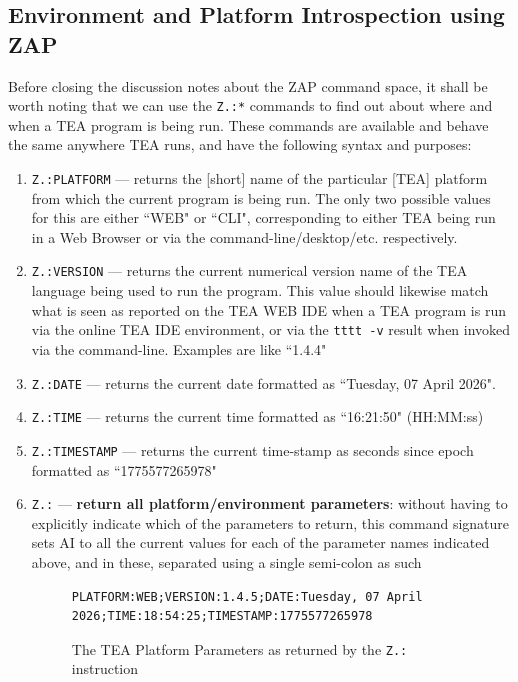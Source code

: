\documentclass[a4paper, 18pt]{book} %
\begin{document}
{{{\subsection{Environment and Platform Introspection using ZAP}

Before closing the discussion notes about the ZAP command space, it shall be worth noting that we can use the \texttt{Z.:*} commands to find out about where and when a TEA program is being run. These commands are available and behave the same anywhere TEA runs, and have the following syntax and purposes:

\vspace{2em}

\begin{enumerate}
\item \texttt{Z.:PLATFORM} --- returns the [short] name of the particular [TEA] platform from which the current program is being run. The only two possible values for this are either ``WEB" or ``CLI", corresponding to either TEA being run in a Web Browser or via the command-line/desktop/etc. respectively.
\item \texttt{Z.:VERSION} --- returns the current numerical version name of the TEA language being used to run the program. This value should likewise match what is seen as reported on the TEA WEB IDE when a TEA program is run via the online TEA IDE environment, or via the \texttt{tttt -v} result when invoked via the command-line. Examples are like ``1.4.4"
\item \texttt{Z.:DATE} --- returns the current date formatted as ``Tuesday, 07 April 2026".
\item \texttt{Z.:TIME} --- returns the current time formatted as ``16:21:50" (HH:MM:ss)
\item \texttt{Z.:TIMESTAMP} --- returns the current time-stamp as seconds since epoch formatted as ``1775577265978"
\item{ \texttt{Z.:} --- \textbf{return all platform/environment parameters}: without having to explicitly indicate which of the parameters to return, this command signature sets AI to all the current values for each of the parameter names indicated above, and in these, separated using a single semi-colon as such 

\begin{figure}[H]
  \centering
  \begin{tcolorbox}[myterminalstyle, title=TEA Environment/Platform Parameters]
  \begin{lstlisting}
PLATFORM:WEB;VERSION:1.4.5;DATE:Tuesday, 07 April 2026;TIME:18:54:25;TIMESTAMP:1775577265978
  \end{lstlisting}
  \end{tcolorbox}
  \caption{The TEA Platform Parameters as returned by the \texttt{Z.:} instruction}
  \label{FIGZPARAMS}
\end{figure}

}
\end{enumerate}}}}
\end{document}
